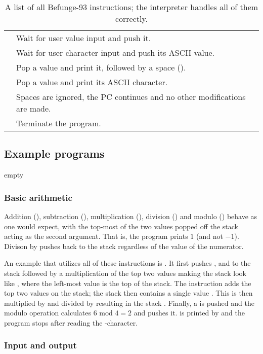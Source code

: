 \documentclass[12pt, a4paper]{article}
\begin{document}
\begin{table}[!hb]
\begin{tabular}{c|l}
\code{\&} & Wait for user value input and push it.\\
\code{\textasciitilde} & Wait for user character input and push its ASCII value.\\
\code{.} & Pop a value and print it, followed by a space (\textvisiblespace).\\
\code{,} & Pop a value and print its ASCII character.\\
\code{\textvisiblespace} & Spaces are ignored, the PC continues and no other modifications are made. \\
\code{@} & Terminate the program.
\end{tabular}
\caption{A list of all Befunge-93 instructions; the interpreter handles all of them correctly.}
\label{tab:instr}
\end{table}

\subsection{Example programs}
\label{sec:examples}

empty

\subsubsection{Basic arithmetic}

Addition (\code{+}), subtraction (\code{-}), multiplication (\code{*}), division (\code{/}) and modulo (\code{\%}) behave as one would expect, with the top-most of the two values popped off the stack acting as the second argument. That is, the program  prints $1$ (and not $-1$). Divison by  pushes  back to the stack regardless of the value of the numerator.

An example that utilizes all of these instructions is . It first pushes ,  and  to the stack followed by a multiplication of the top two values making the stack look like , where the left-most value is the top of the stack. The \code{+} instruction adds the top two values on the stack; the stack then contains a single value . This is then multiplied by  and divided by  resulting in the stack . Finally, a  is pushed and the modulo operation \code{\%} calculates $6 \text{ mod } 4 = 2$ and pushes it.  is printed by  and the program stops after reading the -character.

\subsubsection{Input and output}
\end{document}
